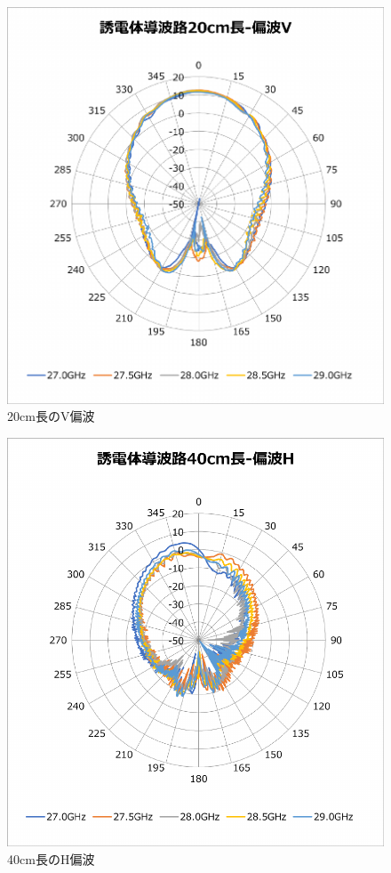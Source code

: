\documentclass[technicalreport]{ieicej}
\begin{document}
\begin{figure}[tb]
  \begin{center}
    \includegraphics[bb=0 0 408 430, width=0.9\linewidth]{img/waveguide-20cm-v.pdf}
    \caption{20cm長のV偏波}
    \label{fig:20cm-v}
  \end{center}
\end{figure}

\begin{figure}[tb]
  \begin{center}
    \includegraphics[bb=0 0 408 430, width=0.9\linewidth]{img/waveguide-40cm-h.pdf}
    \caption{40cm長のH偏波}
    \label{fig:40cm-h}
  \end{center}
\end{figure}
\end{document}

